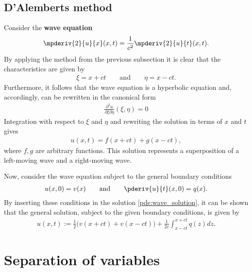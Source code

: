 \subsection{D'Alemberts method}

    Consider the \textbf{wave equation}
    \begin{gather}
        \label{pde:wave_equation}
        \mpderiv{2}{u}{x}(x,t) = \frac{1}{c^2}\mpderiv{2}{u}{t}(x,t).
    \end{gather}
    By applying the method from the previous subsection it is clear that the characteristics are given by
    \begin{gather}
        \xi = x + ct \qquad\text{and}\qquad \eta = x - ct.
    \end{gather}
    Furthermore, it follows that the wave equation is a hyperbolic equation and, accordingly, can be rewritten in the canonical form
    \begin{gather}
        \label{pde:canonical_wave_equation}
        \frac{\partial^2u}{\partial\xi\partial\eta}(\xi,\eta) = 0
    \end{gather}
    Integration with respect to $\xi$ and $\eta$ and rewriting the solution in terms of $x$ and $t$ gives
    \begin{gather}
        \label{pde:wave_solution}
        u(x,t) = f(x+ct) + g(x-ct),
    \end{gather}
    where $f,g$ are arbitrary functions. This solution represents a superposition of a left-moving wave and a right-moving wave.

    Now, consider the wave equation subject to the general boundary conditions
    \begin{gather}
        u(x,0) = v(x) \qquad\text{and}\qquad \pderiv{u}{t}(x,0) = q(x).
    \end{gather}
    By inserting these conditions in the solution \eqref{pde:wave_solution}, it can be shown that the general solution, subject to the given boundary conditions, is given by
    \begin{gather}
        \label{pde:dalembert_solution}
        u(x,t) := \frac{1}{2}\big(v(x+ct) + v(x-ct)\big) + \frac{1}{2c}\int_{x-ct}^{x+ct}q(z)dz.
    \end{gather}

\section{Separation of variables}\label{section:separation_of_variables}

